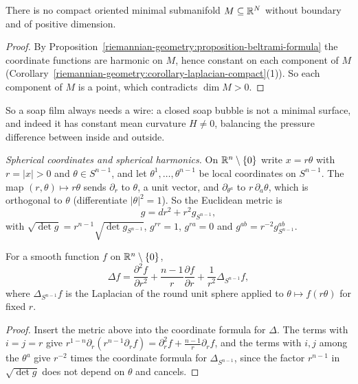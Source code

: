 \begin{corollary}\label{riemannian-geometry:corollary-no-compact-minimal}
There is no compact oriented minimal submanifold $M \subseteq \mathbb{R}^N$ without boundary and of positive dimension.
\end{corollary}

\begin{proof}
By Proposition~\ref{riemannian-geometry:proposition-beltrami-formula} the coordinate functions are harmonic on $M$, hence constant on each component of $M$
(Corollary~\ref{riemannian-geometry:corollary-laplacian-compact}(1)). So each component of $M$ is a point, which contradicts $\dim M > 0$.
\end{proof}

So a soap film always needs a wire: a closed soap bubble is not a minimal surface, and indeed it has constant mean curvature $H \neq 0$, balancing the pressure difference
between inside and outside.

\emph{Spherical coordinates and spherical harmonics.} On $\mathbb{R}^n \setminus \{0\}$ write $x = r\theta$ with $r = |x| > 0$ and $\theta \in S^{n-1}$, and let $\theta^1, \ldots, \theta^{n-1}$ be local
coordinates on $S^{n-1}$. The map $(r, \theta) \mapsto r\theta$ sends $\partial_r$ to $\theta$, a unit vector, and $\partial_{\theta^a}$ to $r\,\partial_a\theta$, which is orthogonal to $\theta$
(differentiate $|\theta|^2 = 1$). So the Euclidean metric is
\[
g = dr^2 + r^2g_{S^{n-1}},
\]
with $\sqrt{\det g} = r^{n-1}\sqrt{\det g_{S^{n-1}}}$, $g^{rr} = 1$, $g^{ra} = 0$ and $g^{ab} = r^{-2}g_{S^{n-1}}^{ab}$.

\begin{proposition}\label{riemannian-geometry:proposition-laplacian-polar}
For a smooth function $f$ on $\mathbb{R}^n \setminus \{0\}$,
\[
\Delta f = \frac{\partial^2f}{\partial r^2} + \frac{n-1}{r}\frac{\partial f}{\partial r} + \frac{1}{r^2}\Delta_{S^{n-1}}f,
\]
where $\Delta_{S^{n-1}}f$ is the Laplacian of the round unit sphere applied to $\theta \mapsto f(r\theta)$ for fixed $r$.
\end{proposition}

\begin{proof}
Insert the metric above into the coordinate formula for $\Delta$. The terms with $i = j = r$ give $r^{1-n}\partial_r(r^{n-1}\partial_rf) = \partial_r^2f + \frac{n-1}r\partial_rf$, and the terms with
$i, j$ among the $\theta^a$ give $r^{-2}$ times the coordinate formula for $\Delta_{S^{n-1}}$, since the factor $r^{n-1}$ in $\sqrt{\det g}$ does not depend on $\theta$ and cancels.
\end{proof}

